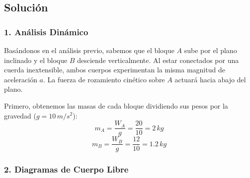 \documentclass[12pt, a4paper]{article}
\begin{document}
\subsection*{Solución}

\subsubsection*{1. Análisis Dinámico}
Basándonos en el análisis previo, sabemos que el bloque $A$ sube por el plano inclinado y el bloque $B$ desciende verticalmente. Al estar conectados por una cuerda inextensible, ambos cuerpos experimentan la misma magnitud de aceleración $a$. La fuerza de rozamiento cinético sobre $A$ actuará hacia abajo del plano.

Primero, obtenemos las masas de cada bloque dividiendo sus pesos por la gravedad ($g = 10\,\si{m/s^2}$):
$$ m_A = \frac{W_A}{g} = \frac{20}{10} = 2\,\si{kg} $$
$$ m_B = \frac{W_B}{g} = \frac{12}{10} = 1.2\,\si{kg} $$

\subsubsection*{2. Diagramas de Cuerpo Libre}
\end{document}
